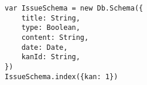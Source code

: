 

\lstset{language=C}

\begin{lstlisting}[frame=single]
var IssueSchema = new Db.Schema({
	title: String,
	type: Boolean,
	content: String,
	date: Date,
	kanId: String,
})
IssueSchema.index({kan: 1})
\end{lstlisting}